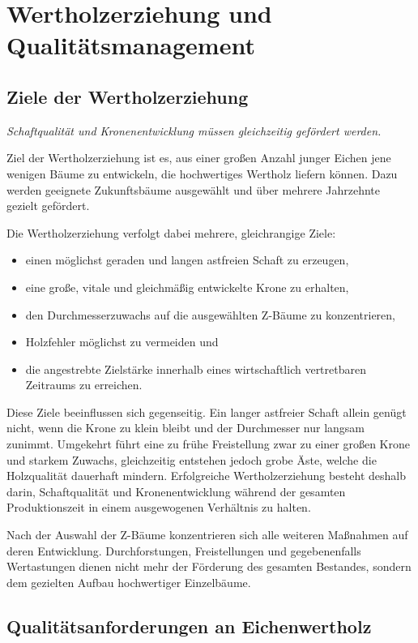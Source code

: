\documentclass[twocolumn, bibliography=totoc, abstract=true]{scrartcl}
\begin{document}
\section{Wertholzerziehung und Qualitätsmanagement}

\subsection{Ziele der Wertholzerziehung}

\emph{Schaftqualität und Kronenentwicklung müssen gleichzeitig gefördert werden.}

Ziel der Wertholzerziehung ist es, aus einer großen Anzahl junger Eichen jene wenigen Bäume zu entwickeln, die hochwertiges Wertholz liefern können. Dazu werden geeignete Zukunftsbäume ausgewählt und über mehrere Jahrzehnte gezielt gefördert.

Die Wertholzerziehung verfolgt dabei mehrere, gleichrangige Ziele:

\begin{itemize}
\item einen möglichst geraden und langen astfreien Schaft zu erzeugen,
\item eine große, vitale und gleichmäßig entwickelte Krone zu erhalten,
\item den Durchmesserzuwachs auf die ausgewählten Z-Bäume zu konzentrieren,
\item Holzfehler möglichst zu vermeiden und
\item die angestrebte Zielstärke innerhalb eines wirtschaftlich vertretbaren Zeitraums zu erreichen.
\end{itemize}

Diese Ziele beeinflussen sich gegenseitig. Ein langer astfreier Schaft allein genügt nicht, wenn die Krone zu klein bleibt und der Durchmesser nur langsam zunimmt. Umgekehrt führt eine zu frühe Freistellung zwar zu einer großen Krone und starkem Zuwachs, gleichzeitig entstehen jedoch grobe Äste, welche die Holzqualität dauerhaft mindern. Erfolgreiche Wertholzerziehung besteht deshalb darin, Schaftqualität und Kronenentwicklung während der gesamten Produktionszeit in einem ausgewogenen Verhältnis zu halten.

Nach der Auswahl der Z-Bäume konzentrieren sich alle weiteren Maßnahmen auf deren Entwicklung. Durchforstungen, Freistellungen und gegebenenfalls Wertastungen dienen nicht mehr der Förderung des gesamten Bestandes, sondern dem gezielten Aufbau hochwertiger Einzelbäume.

\subsection{Qualitätsanforderungen an Eichenwertholz}
\end{document}
